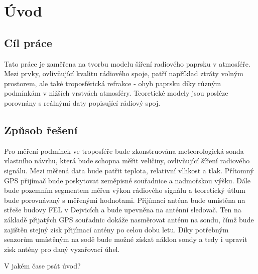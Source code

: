 \documentclass[twoside]{ctuthesis}
\theoremstyle{plain}
\theoremstyle{definition}
\theoremstyle{note}
\begin{document}
\maketitle

\chapter{Úvod}
	\section{Cíl práce}
	Tato práce je zaměřena na tvorbu modelu šíření radiového paprsku v atmosféře. Mezi prvky, ovlivňující kvalitu rádiového spoje, patří například ztráty volným prostorem, ale také troposférická refrakce - ohyb paprsku díky různým podmínkám v nižších vrstvách atmosféry. Teoretické modely jsou posléze porovnány s reálnými daty popisující rádiový spoj.
	

	\section{Způsob řešení}
	Pro měření podmínek ve troposféře bude zkonstruována meteorologická sonda vlastního návrhu, která bude schopna měřit veličiny, ovlivňující šíření radiového signálu. Mezi měřená data bude patřit teplota, relativní vlhkost a tlak. Přítomný GPS přijímač bude poskytovat zeměpisné souřadnice a nadmořskou výšku. Dále bude pozemním segmentem měřen výkon rádiového signálu a teoretický útlum bude porovnávaný s měřenými hodnotami. Přijímací anténa bude umístěna na střeše budovy FEL v Dejvicích a bude upevněna na anténní sledovač. Ten na základě přijatých GPS souřadnic dokáže nasměrovat anténu na sondu, čímž bude zajištěn stejný zisk přijímací antény po celou dobu letu. Díky potřebným senzorům umístěným na sodě bude možné získat náklon sondy a tedy i upravit zisk antény pro daný vyzařovací úhel.

	V jakém čase psát úvod?



	
\end{document}
